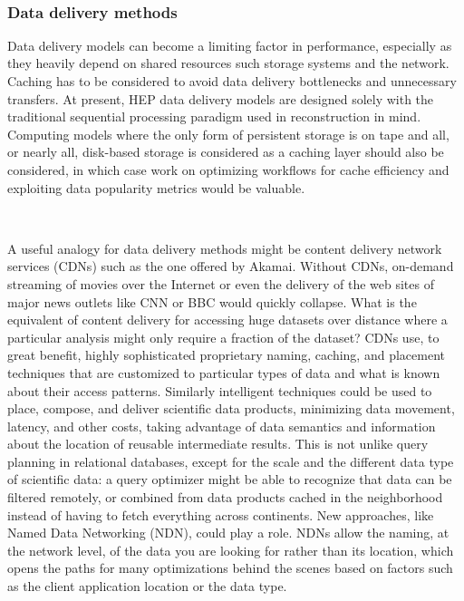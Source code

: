 \documentclass[12pt,a4paper]{article}
\begin{document}
~

\subsubsection{Data delivery methods}\label{data-delivery-methods}

Data delivery models can become a limiting factor in performance,
especially as they heavily depend on shared resources such storage
systems and the network. Caching has to be considered to avoid data
delivery bottlenecks and unnecessary transfers. At present, HEP data
delivery models are designed solely with the traditional sequential
processing paradigm used in reconstruction in mind. Computing models
where the only form of persistent storage is on tape and all, or nearly
all, disk-based storage is considered as a caching layer should also be
considered, in which case work on optimizing workflows for cache
efficiency and exploiting data popularity metrics would be valuable.

~

A useful analogy for data delivery methods might be content delivery
network services (CDNs) such as the one offered by Akamai. Without CDNs,
on-demand streaming of movies over the Internet or even the delivery of
the web sites of major news outlets like CNN or BBC would quickly
collapse. What is the equivalent of content delivery for accessing huge
datasets over distance where a particular analysis might only
require a fraction of the dataset? CDNs use, to great benefit, highly
sophisticated proprietary naming, caching, and placement techniques
that are customized to particular types of data and what is known about
their access patterns. Similarly intelligent techniques could be used to
place, compose, and deliver scientific data products, minimizing data
movement, latency, and other costs, taking advantage of data semantics
and information about the location of reusable intermediate results.
This is not unlike query planning in relational databases, except for
the scale and the different data type of scientific data: a query
optimizer might be able to recognize that data can be filtered remotely,
or combined from data products cached in the neighborhood instead of
having to fetch everything across continents. New approaches, like Named
Data Networking (NDN), could play a role. NDNs allow the naming, at the
network level, of the data you are looking for rather than its location, which
opens the paths for many optimizations behind the scenes based on
factors such as the client application location or the data type.
\end{document}
